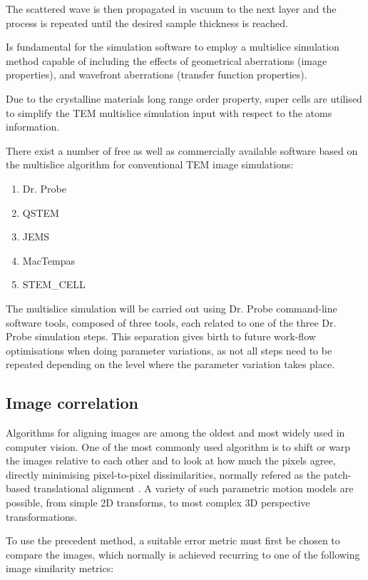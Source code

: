 \documentclass[
  oneside,
  11pt, a4paper,
  footinclude=true,
  headinclude=true,
  cleardoublepage=empty
]{scrbook}
\begin{document}
		The scattered wave is then propagated in vacuum to the next layer and the process is repeated until the desired sample thickness is reached.
		
		Is fundamental for the simulation software to employ a multislice simulation method capable of including the effects of geometrical aberrations (image properties), and 
  wavefront aberrations (transfer function properties).\par 
		
		Due to the crystalline materials long range order property, 
		super cells are utilised to  simplify the TEM multislice simulation input with respect to the atoms information.\par 
		
		There exist a number of free as well as commercially available software  based on the multislice algorithm for conventional TEM image simulations:
		\begin{enumerate}
				    \item Dr. Probe \citep{drprobe}
		    \item QSTEM \citep{koch2002determination}
		    \item JEMS \citep{stadelmann2014java}
		    \item MacTempas \citep{kilaas2014mactempasx}
		    \item STEM\_CELL \citep{stemcell}
		\end{enumerate}
		
		The multislice simulation will be carried out using Dr. Probe \citep{drprobe} %
		command-line software tools, composed of three tools, each related to one of the three Dr. Probe simulation steps.  This separation gives birth to future work-flow optimisations when doing parameter variations, as not all steps need to be repeated depending on the level where the parameter variation takes place.

		
	\subsection{Image correlation}
	
	Algorithms for aligning images are among the oldest and most widely used in computer vision.	One of the most commonly used algorithm is to shift or warp the images relative to each other and to look at how much the pixels agree, directly minimising pixel-to-pixel dissimilarities, normally refered as  the patch-based translational alignment \citep{lucas1981iterative}. 
	A variety of such parametric motion models are possible, from simple 2D transforms, to most complex 3D perspective transformations.\par 
	To use the precedent method, a suitable error metric must first be chosen to compare the images, which normally is achieved recurring to one of the following image similarity metrics\citep{brown1992survey}:
	
\end{document}
